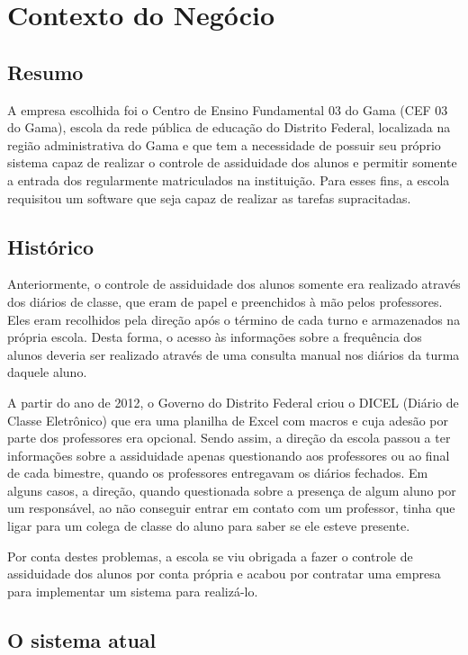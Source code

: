 \chapter{Contexto do Negócio}

  \section{Resumo}

  A empresa escolhida foi o Centro de Ensino Fundamental 03 do Gama (CEF 03 do
  Gama), escola da rede pública de educação do Distrito Federal, localizada na
  região administrativa do Gama e que tem a necessidade de possuir seu próprio
  sistema capaz de realizar o controle de assiduidade dos alunos e permitir
  somente a entrada dos regularmente matriculados na instituição. Para esses
  fins, a escola requisitou um software que seja capaz de realizar as tarefas
  supracitadas.

  \section{Histórico}

  Anteriormente, o controle de assiduidade dos alunos somente era realizado
  através dos diários de classe, que eram de papel e preenchidos à mão pelos
  professores. Eles eram recolhidos pela direção após o término de cada turno e
  armazenados na própria escola. Desta forma, o acesso às informações sobre a
  frequência dos alunos deveria ser realizado através de uma consulta manual
  nos diários da turma daquele aluno.

  A partir do ano de 2012, o Governo do Distrito Federal criou o DICEL (Diário
  de Classe Eletrônico) que era uma planilha de Excel com macros e cuja adesão
  por parte dos professores era opcional. Sendo assim, a direção da escola
  passou a ter informações sobre a assiduidade apenas questionando aos
  professores ou ao final de cada bimestre, quando os professores entregavam os
  diários fechados. Em alguns casos, a direção, quando questionada sobre a
  presença de algum aluno por um responsável, ao não conseguir entrar em contato
  com um professor, tinha que ligar para um colega de classe do aluno para saber
  se ele esteve presente.

  Por conta destes problemas, a escola se viu obrigada a fazer o controle de
  assiduidade dos alunos por conta própria e acabou por contratar uma empresa
  para implementar um sistema para realizá-lo.

  \section{O sistema atual}


